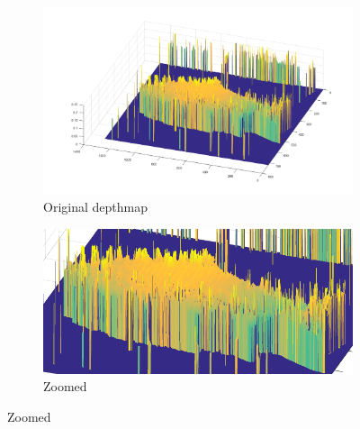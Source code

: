 \begin{figure}[H]
    \begin{subfigure}{0.41\textwidth}
        \includegraphics[width=\linewidth]{images/results/3D_plots/original_3D_63}
        \caption{Original depthmap}
    \end{subfigure}\hspace*{\fill}
    \begin{subfigure}{0.57\textwidth}
        \includegraphics[width=\linewidth]{images/results/3D_plots/zoomed_original_3D_63}
        \caption{Zoomed}
    \end{subfigure}
    

\end{figure}
